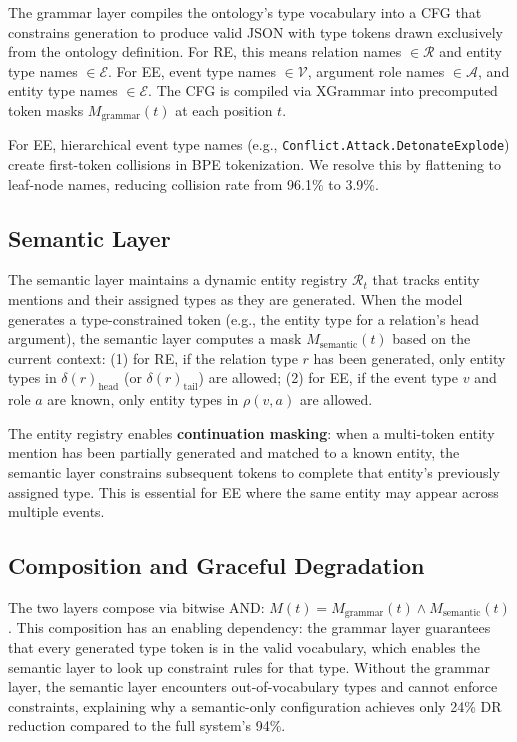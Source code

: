 \documentclass[11pt,a4paper]{article}
\begin{document}
The grammar layer compiles the ontology's type vocabulary into a CFG that constrains generation to produce valid JSON with type tokens drawn exclusively from the ontology definition. For RE, this means relation names $\in \mathcal{R}$ and entity type names $\in \mathcal{E}$. For EE, event type names $\in \mathcal{V}$, argument role names $\in \mathcal{A}$, and entity type names $\in \mathcal{E}$. The CFG is compiled via XGrammar into precomputed token masks $M_{\text{grammar}}(t)$ at each position $t$.

For EE, hierarchical event type names (e.g., \texttt{Conflict.Attack.DetonateExplode}) create first-token collisions in BPE tokenization. We resolve this by flattening to leaf-node names, reducing collision rate from 96.1\% to 3.9\%.

\subsection{Semantic Layer}
\label{sec:semantic}

The semantic layer maintains a dynamic entity registry $\mathcal{R}_t$ that tracks entity mentions and their assigned types as they are generated. When the model generates a type-constrained token (e.g., the entity type for a relation's head argument), the semantic layer computes a mask $M_{\text{semantic}}(t)$ based on the current context: (1) for RE, if the relation type $r$ has been generated, only entity types in $\delta(r)_{\text{head}}$ (or $\delta(r)_{\text{tail}}$) are allowed; (2) for EE, if the event type $v$ and role $a$ are known, only entity types in $\rho(v, a)$ are allowed.

The entity registry enables \textbf{continuation masking}: when a multi-token entity mention has been partially generated and matched to a known entity, the semantic layer constrains subsequent tokens to complete that entity's previously assigned type. This is essential for EE where the same entity may appear across multiple events.

\subsection{Composition and Graceful Degradation}
\label{sec:composition}

The two layers compose via bitwise AND: $M(t) = M_{\text{grammar}}(t) \wedge M_{\text{semantic}}(t)$. This composition has an enabling dependency: the grammar layer guarantees that every generated type token is in the valid vocabulary, which enables the semantic layer to look up constraint rules for that type. Without the grammar layer, the semantic layer encounters out-of-vocabulary types and cannot enforce constraints, explaining why a semantic-only configuration achieves only 24\% DR reduction compared to the full system's 94\%.
\end{document}
